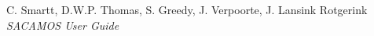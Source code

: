 \begin{thebibliography}{9}

C. Smartt, D.W.P. Thomas, S. Greedy, J. Verpoorte, J. Lansink Rotgerink
\textsl{SACAMOS User Guide}


\end{thebibliography}


